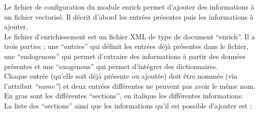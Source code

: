 \documentclass[manual-fr.tex]{subfiles}
\begin{document}
Le fichier de configuration du module enrich permet d'ajouter des informations à un fichier vectorisé. Il décrit d'abord les entrées présentes
puis les informations à ajouter.\\

Le fichier d'enrichissement est un fichier XML de type de document ``enrich''. Il a trois parties : une ``entries'' qui définit les entrées déjà
présentes dans le fichier, une ``endogenous'' qui permet d'extraire des informations à partir des données présentes et une ``exogenous'' qui permet
d'intégrer des dictionnaires.\\

Chaque entrée (qu'elle soit déjà présente ou ajoutée) doit être nommée (via l'attribut \emph{``name''}) et deux entrées différentes ne peuvent pas
avoir le même nom. En gras sont les différentes ``sections'', en italique les différentes informations.\\

La liste des ``sections'' ainsi que les informations qu'il est possible d'ajouter est :
\end{document}
